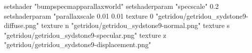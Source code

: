 setshader "bumpspecmapparallaxworld"
setshaderparam "specscale" 0.2
setshaderparam "parallaxscale 0.01 0.01
texture 0 "getridou/getridou_sydstone9-diffuse.png"
texture n "getridou/getridou_sydstone9-normal.png"
texture s "getridou/getridou_sydstone9-specular.png"
texture z "getridou/getridou_sydstone9-displacement.png"

